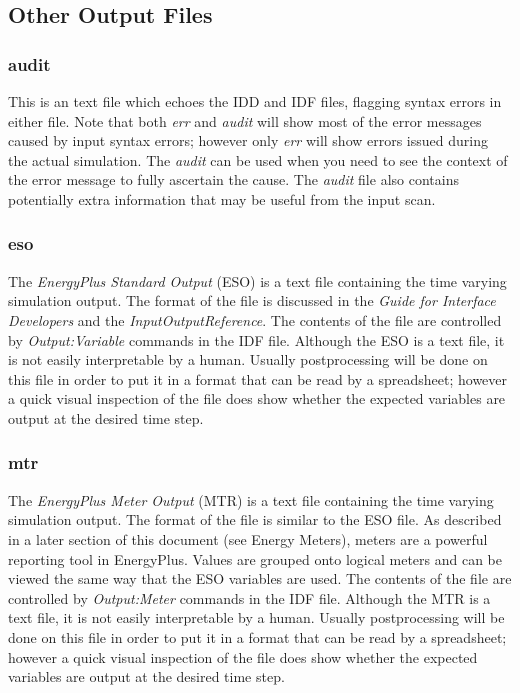 \subsection{Other Output Files}\label{other-output-files}

\subsubsection{audit}\label{audit}

This is an text file which echoes the IDD and IDF files, flagging syntax errors in either file. Note that both \emph{err} and \emph{audit} will show most of the error messages caused by input syntax errors; however only \emph{err} will show errors issued during the actual simulation. The \emph{audit} can be used when you need to see the context of the error message to fully ascertain the cause. The \emph{audit} file also contains potentially extra information that may be useful from the input scan.

\subsubsection{eso}\label{eso}

The \emph{EnergyPlus Standard Output} (ESO) is a text file containing the time varying simulation output. The format of the file is discussed in the \emph{Guide for Interface Developers} and the \emph{InputOutputReference}. The contents of the file are controlled by \emph{Output:Variable} commands in the IDF file. Although the ESO is a text file, it is not easily interpretable by a human. Usually postprocessing will be done on this file in order to put it in a format that can be read by a spreadsheet; however a quick visual inspection of the file does show whether the expected variables are output at the desired time step.

\subsubsection{mtr}\label{mtr}

The \emph{EnergyPlus Meter Output} (MTR) is a text file containing the time varying simulation output. The format of the file is similar to the ESO file. As described in a later section of this document (see Energy Meters), meters are a powerful reporting tool in EnergyPlus. Values are grouped onto logical meters and can be viewed the same way that the ESO variables are used. The contents of the file are controlled by \emph{Output:Meter} commands in the IDF file. Although the MTR is a text file, it is not easily interpretable by a human. Usually postprocessing will be done on this file in order to put it in a format that can be read by a spreadsheet; however a quick visual inspection of the file does show whether the expected variables are output at the desired time step.

